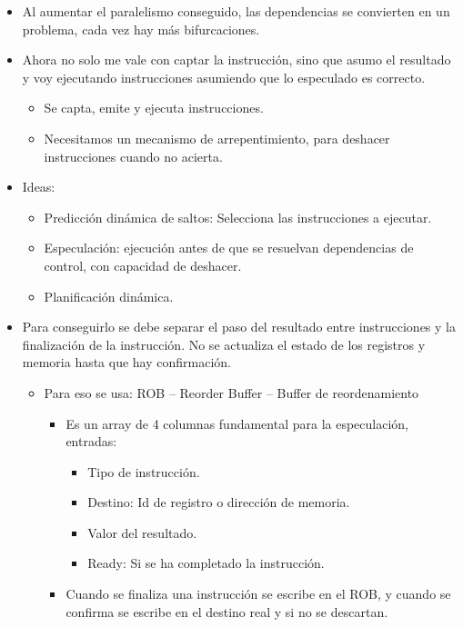 \documentclass[12pt, twoside, openright]{report} %
\begin{document}
  \begin{itemize}
  
  \item
    Al aumentar el paralelismo conseguido, las dependencias se
    convierten en un problema, cada vez hay más bifurcaciones.
  \item
    Ahora no solo me vale con captar la instrucción, sino que asumo el
    resultado y voy ejecutando instrucciones asumiendo que lo especulado
    es correcto.

    \begin{itemize}
    
    \item
      Se capta, emite y ejecuta instrucciones.
    \item
      Necesitamos un mecanismo de arrepentimiento, para deshacer
      instrucciones cuando no acierta.
    \end{itemize}
  \item
    Ideas:

    \begin{itemize}
    
    \item
      Predicción dinámica de saltos: Selecciona las instrucciones a
      ejecutar.
    \item
      Especulación: ejecución antes de que se resuelvan dependencias de
      control, con capacidad de deshacer.
    \item
      Planificación dinámica.
    \end{itemize}
  \item
    Para conseguirlo se debe separar el paso del resultado entre
    instrucciones y la finalización de la instrucción. No se actualiza
    el estado de los registros y memoria hasta que hay confirmación.

    \begin{itemize}
    
    \item
      Para eso se usa: ROB -- Reorder Buffer -- Buffer de reordenamiento

      \begin{itemize}
      
      \item
        Es un array de 4 columnas fundamental para la especulación,
        entradas:

        \begin{itemize}
        
        \item
          Tipo de instrucción.
        \item
          Destino: Id de registro o dirección de memoria.
        \item
          Valor del resultado.
        \item
          Ready: Si se ha completado la instrucción.
        \end{itemize}
        \item
      Cuando se finaliza una instrucción se escribe en el ROB, y cuando
      se confirma se escribe en el destino real y si no se descartan.
      

\end{itemize}
\end{itemize}
\end{itemize}
\end{document}
